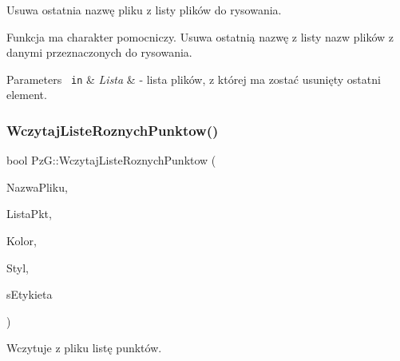 Usuwa ostatnia nazwę pliku z listy plików do rysowania. 

Funkcja ma charakter pomocniczy. Usuwa ostatnią nazwę z listy nazw plików z danymi przeznaczonych do rysowania. 
\begin{DoxyParams}[1]{Parameters}
\mbox{\texttt{ in}}  & {\em Lista} & -\/ lista plików, z której ma zostać usunięty ostatni element. \\
\hline
\end{DoxyParams}
\mbox{\label{namespace_pz_g_a169c311f0e0b6ffadcd44e91e749f72d}} 
\subsubsection{\texorpdfstring{WczytajListeRoznychPunktow()}{WczytajListeRoznychPunktow()}}
{\footnotesize\ttfamily bool Pz\+G\+::\+Wczytaj\+Liste\+Roznych\+Punktow (\begin{DoxyParamCaption}\item[{const char $\ast$}]{Nazwa\+Pliku,  }\item[{\mbox{\hyperlink{namespace_pz_g_a663e923efc195ea10f6f7086c6da490b}{Typ\+Lista\+Punktow}} \&}]{Lista\+Pkt,  }\item[{int}]{Kolor,  }\item[{int}]{Styl,  }\item[{const char $\ast$}]{s\+Etykieta }\end{DoxyParamCaption})}



Wczytuje z pliku listę punktów. 

